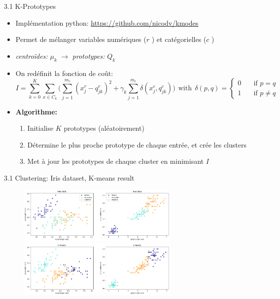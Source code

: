 \begin{frame}{3.1 K-Prototypes}
  \begin{itemize}
  \item Implémentation python: \underline{\href{https://github.com/nicodv/kmodes}{https://github.com/nicodv/kmodes}}
  \item Permet de mélanger variables \textcolor{orangeAgaetis}{numériques} (\boldmath $r$ \unboldmath) et \textcolor{orangeAgaetis}{catégorielles} (\boldmath $c$ \unboldmath)
  \item \textit{centroïdes:} $\mu_{k}$ \boldmath $\rightarrow$ \unboldmath \textit{prototypes:} $Q_{k}$
  \item On redéfinit la fonction de coût:
    \begin{equation*}
      I = \displaystyle\sum_{k=0}^{K}\displaystyle\sum_{x \in C_{k}} \Big( \displaystyle\sum_{j=1}^{m_{r}}(x_{j}^{r} - q_{jk}^{r})^{2} + \gamma_{k}\displaystyle\sum_{j=1}^{m_{c}}\delta(x_{j}^{c}, q_{jk}^{c})\Big) ~~\text{with}~~ \delta(p,q) = \begin{cases} 0 & \quad \text{if } p = q\\ 1 & \quad \text{if } p \neq q \end{cases}
    \end{equation*}
  \item \textbf{\textcolor{orangeAgaetis}{Algorithme:}}
    \begin{enumerate}
      \normalsize
    \item Initialise \boldmath $K$ \unboldmath prototypes (aléatoirement)
    \item Détermine le plus proche prototype de chaque entrée, et crée les clusters
    \item Met à jour les prototypes de chaque cluster en minimisant $I$
    \end{enumerate}
  \end{itemize}
\end{frame}

\begin{frame}{3.1 Clustering: Iris dataset, K-means result}
  \begin{figure}
    \includegraphics[width=0.7\textwidth]{figs/clusteringTrue.png}
    \includegraphics[width=0.7\textwidth]{figs/clusteringKmeans.png}
  \end{figure}
\end{frame}

